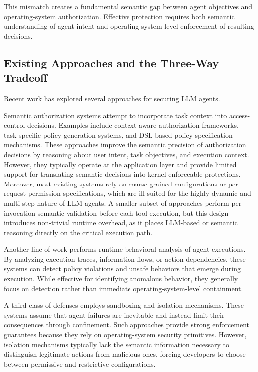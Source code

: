 This mismatch creates a fundamental semantic gap between agent objectives and operating-system authorization. Effective protection requires both semantic understanding of agent intent and operating-system-level enforcement of resulting decisions.

\subsection{Existing Approaches and the Three-Way Tradeoff}

Recent work has explored several approaches for securing LLM agents.

Semantic authorization systems attempt to incorporate task context into access-control decisions. Examples include context-aware authorization frameworks, task-specific policy generation systems, and DSL-based policy specification mechanisms. These approaches improve the semantic precision of authorization decisions by reasoning about user intent, task objectives, and execution context. However, they typically operate at the application layer and provide limited support for translating semantic decisions into kernel-enforceable protections. Moreover, most existing systems rely on coarse-grained configurations or per-request permission specifications, which are ill-suited for the highly dynamic and multi-step nature of LLM agents. A smaller subset of approaches perform per-invocation semantic validation before each tool execution, but this design introduces non-trivial runtime overhead, as it places LLM-based or semantic reasoning directly on the critical execution path.

Another line of work performs runtime behavioral analysis of agent executions. By analyzing execution traces, information flows, or action dependencies, these systems can detect policy violations and unsafe behaviors that emerge during execution. While effective for identifying anomalous behavior, they generally focus on detection rather than immediate operating-system-level containment.

A third class of defenses employs sandboxing and isolation mechanisms. These systems assume that agent failures are inevitable and instead limit their consequences through confinement. Such approaches provide strong enforcement guarantees because they rely on operating-system security primitives. However, isolation mechanisms typically lack the semantic information necessary to distinguish legitimate actions from malicious ones, forcing developers to choose between permissive and restrictive configurations.

